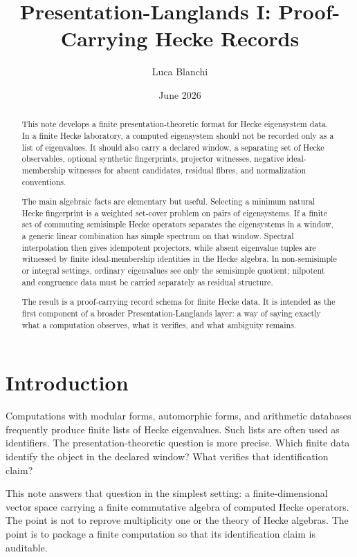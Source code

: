 \documentclass[11pt]{article}
\title{Presentation-Langlands I: Proof-Carrying Hecke Records}
\author{Luca Blanchi}
\date{June 2026}
\begin{document}
\maketitle

\begin{abstract}
This note develops a finite presentation-theoretic format for Hecke eigensystem data.  In a finite Hecke laboratory, a computed eigensystem should not be recorded only as a list of eigenvalues.  It should also carry a declared window, a separating set of Hecke observables, optional synthetic fingerprints, projector witnesses, negative ideal-membership witnesses for absent candidates, residual fibres, and normalization conventions.

The main algebraic facts are elementary but useful.  Selecting a minimum natural Hecke fingerprint is a weighted set-cover problem on pairs of eigensystems.  If a finite set of commuting semisimple Hecke operators separates the eigensystems in a window, a generic linear combination has simple spectrum on that window.  Spectral interpolation then gives idempotent projectors, while absent eigenvalue tuples are witnessed by finite ideal-membership identities in the Hecke algebra.  In non-semisimple or integral settings, ordinary eigenvalues see only the semisimple quotient; nilpotent and congruence data must be carried separately as residual structure.

The result is a proof-carrying record schema for finite Hecke data.  It is intended as the first component of a broader Presentation-Langlands layer: a way of saying exactly what a computation observes, what it verifies, and what ambiguity remains.
\end{abstract}

\section{Introduction}

Computations with modular forms, automorphic forms, and arithmetic databases frequently produce finite lists of Hecke eigenvalues.  Such lists are often used as identifiers.  The presentation-theoretic question is more precise.  Which finite data identify the object in the declared window?  What verifies that identification claim?

This note answers that question in the simplest setting: a finite-dimensional vector space carrying a finite commutative algebra of computed Hecke operators.  The point is not to reprove multiplicity one or the theory of Hecke algebras.  The point is to package a finite computation so that its identification claim is auditable.
\end{document}
